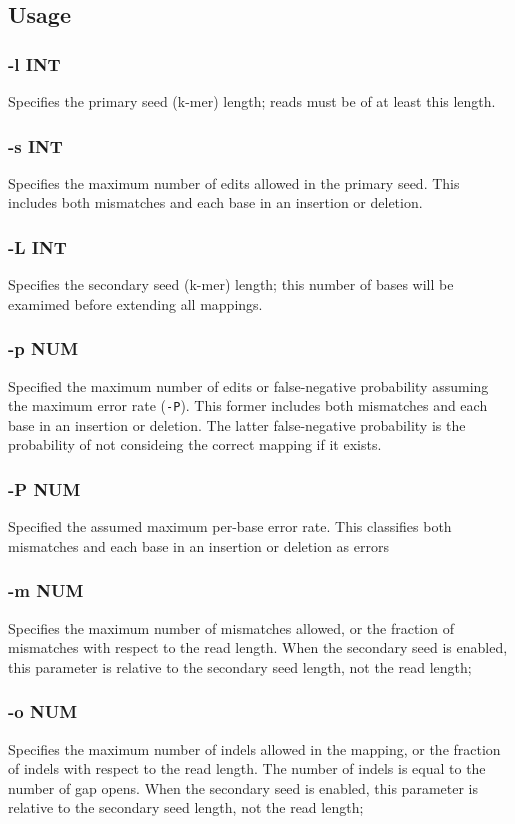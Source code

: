 \documentclass[a4paper,12pt]{book}
\newcommand{\TT}[1]{{\tt #1}} %
\begin{document}
\subsection{Usage}

\subsubsection{-l INT}
Specifies the primary seed (k-mer) length; reads must be of at least this length.

\subsubsection{-s INT}
Specifies the maximum number of edits allowed in the primary seed.
This includes both mismatches and each base in an insertion or deletion. 

\subsubsection{-L INT}
Specifies the secondary seed (k-mer) length; this number of bases will be examimed before extending all mappings.

\subsubsection{-p NUM}
Specified the maximum number of edits or false-negative probability assuming the maximum error rate (\TT{-P}).
This former includes both mismatches and each base in an insertion or deletion. 
The latter false-negative probability is the probability of not consideing the correct mapping if it exists. 

\subsubsection{-P NUM}
Specified the assumed maximum per-base error rate.
This classifies both mismatches and each base in an insertion or deletion as errors 

\subsubsection{-m NUM}
Specifies the maximum number of mismatches allowed, or the fraction of mismatches with respect to the read length.
When the secondary seed is enabled, this parameter is relative to the secondary seed length, not the read length;

\subsubsection{-o NUM}
Specifies the maximum number of indels allowed in the mapping, or the fraction of indels with respect to the read length.
The number of indels is equal to the number of gap opens.
When the secondary seed is enabled, this parameter is relative to the secondary seed length, not the read length;
\end{document}
